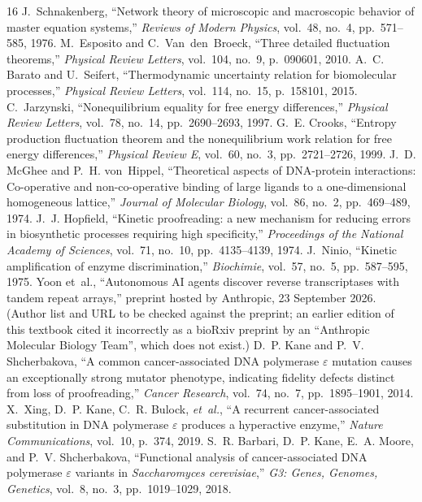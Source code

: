 \documentclass[11pt,a4paper]{article}
\theoremstyle{definition}
\theoremstyle{remark}
\begin{document}
\begin{thebibliography}{16}
J.~Schnakenberg, ``Network theory of microscopic and macroscopic behavior of master equation systems,'' \emph{Reviews of Modern Physics}, vol.~48, no.~4, pp.~571--585, 1976.
M.~Esposito and C.~Van~den~Broeck, ``Three detailed fluctuation theorems,'' \emph{Physical Review Letters}, vol.~104, no.~9, p.~090601, 2010.
A.~C. Barato and U.~Seifert, ``Thermodynamic uncertainty relation for biomolecular processes,'' \emph{Physical Review Letters}, vol.~114, no.~15, p.~158101, 2015.
C.~Jarzynski, ``Nonequilibrium equality for free energy differences,'' \emph{Physical Review Letters}, vol.~78, no.~14, pp.~2690--2693, 1997.
G.~E. Crooks, ``Entropy production fluctuation theorem and the nonequilibrium work relation for free energy differences,'' \emph{Physical Review E}, vol.~60, no.~3, pp.~2721--2726, 1999.
J.~D. McGhee and P.~H. von~Hippel, ``Theoretical aspects of DNA-protein interactions: Co-operative and non-co-operative binding of large ligands to a one-dimensional homogeneous lattice,'' \emph{Journal of Molecular Biology}, vol.~86, no.~2, pp.~469--489, 1974.
J.~J. Hopfield, ``Kinetic proofreading: a new mechanism for reducing errors in biosynthetic processes requiring high specificity,'' \emph{Proceedings of the National Academy of Sciences}, vol.~71, no.~10, pp.~4135--4139, 1974.
J.~Ninio, ``Kinetic amplification of enzyme discrimination,'' \emph{Biochimie}, vol.~57, no.~5, pp.~587--595, 1975.
Yoon et~al., ``Autonomous AI agents discover reverse transcriptases with tandem repeat arrays,'' preprint hosted by Anthropic, 23 September 2026. (Author list and URL to be checked against the preprint; an earlier edition of this textbook cited it incorrectly as a bioRxiv preprint by an ``Anthropic Molecular Biology Team'', which does not exist.)
D.~P. Kane and P.~V. Shcherbakova, ``A common cancer-associated DNA polymerase $\varepsilon$ mutation causes an exceptionally strong mutator phenotype, indicating fidelity defects distinct from loss of proofreading,'' \emph{Cancer Research}, vol.~74, no.~7, pp.~1895--1901, 2014.
X.~Xing, D.~P. Kane, C.~R. Bulock, \emph{et~al.}, ``A recurrent cancer-associated substitution in DNA polymerase $\varepsilon$ produces a hyperactive enzyme,'' \emph{Nature Communications}, vol.~10, p.~374, 2019.
S.~R. Barbari, D.~P. Kane, E.~A. Moore, and P.~V. Shcherbakova, ``Functional analysis of cancer-associated DNA polymerase $\varepsilon$ variants in \emph{Saccharomyces cerevisiae},'' \emph{G3: Genes, Genomes, Genetics}, vol.~8, no.~3, pp.~1019--1029, 2018.

\end{thebibliography}
\end{document}
